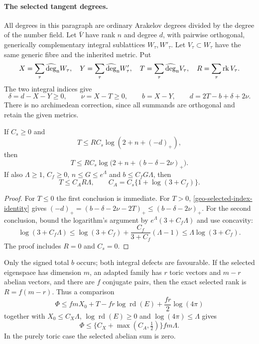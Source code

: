 \paragraph{The selected tangent degrees.}
All degrees in this paragraph are ordinary Arakelov degrees divided by
the degree of the number field. Let $\bar V$ have rank $n$ and degree
$d$, with pairwise orthogonal, generically complementary integral
sublattices $W_\tau,W'_\tau$. Let $V_\tau\subset W_\tau$ have the same
generic fibre and the inherited metric. Put
\[
 X=\sum_\tau\widehat{\deg}_{\rm n}W_\tau,\quad
 Y=\sum_\tau\widehat{\deg}_{\rm n}W'_\tau,\quad
 T=\sum_\tau\widehat{\deg}_{\rm n}V_\tau,\quad
 R=\sum_\tau\operatorname{rk}V_\tau .
\]
The two integral indices give
\begin{equation}\label{geo-selected-index-identity}
 \delta=d-X-Y\ge0,\qquad \nu=X-T\ge0,\qquad
 b=X-Y,\qquad d=2T-b+\delta+2\nu .
\end{equation}
There is no archimedean correction, since all summands are orthogonal
and retain the given metrics.

\begin{proposition}\label{geo-selected-tangent-sum}
If $C_s\ge0$ and
\[
 T\le RC_s\log(2+n+(-d)_+),
\]
then
\[
 T\le RC_s\log\bigl(2+n+(b-\delta-2\nu)_+\bigr).
\]
If also $\Lambda\ge1$, $C_f\ge0$, $n\le G\le e^\Lambda$ and
$b\le C_fG\Lambda$, then
\begin{equation}\label{geo-selected-log-budget}
 T\le C_A R\Lambda,\qquad C_A=C_s\{1+\log(3+C_f)\}.
\end{equation}
\end{proposition}
\begin{proof}
For $T\le0$ the first conclusion is immediate. For $T>0$,
\eqref{geo-selected-index-identity} gives
$(-d)_+=(b-\delta-2\nu-2T)_+\le(b-\delta-2\nu)_+$.
For the second conclusion, bound the logarithm's argument by
$e^\Lambda(3+C_f\Lambda)$ and use concavity:
\[
 \log(3+C_f\Lambda)
 \le\log(3+C_f)+\frac{C_f}{3+C_f}(\Lambda-1)
 \le\Lambda\log(3+C_f).
\]
The proof includes $R=0$ and $C_s=0$.
\end{proof}

Only the signed total $b$ occurs; both integral defects are favourable.
If the selected eigenspace has dimension $m$, an adapted family has
$r$ toric vectors and $m-r$ abelian vectors, and there are $f$ conjugate
pairs, then the exact selected rank is $R=f(m-r)$. Thus a comparison
\[
 \Phi\le fmX_0+T-fr\log\operatorname{rd}(E)
                         +\frac{fr}{2}\log(4\pi)
\]
together with $X_0\le C_X\Lambda$, $\log\operatorname{rd}(E)\ge0$ and
$\log(4\pi)\le\Lambda$ gives
\[
 \Phi\le\{C_X+\max(C_A,\tfrac12)\}fm\Lambda .
\]
In the purely toric case the selected abelian sum is zero.

